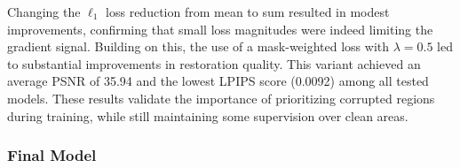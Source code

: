 \documentclass[10pt,a4paper,twocolumn,twoside]{article}
\begin{document}
Changing the $\ell_1$ loss reduction from mean to sum resulted in modest improvements, confirming that small loss magnitudes were indeed limiting the gradient signal. Building on this, the use of a mask-weighted loss with $\lambda = 0.5$ led to substantial improvements in restoration quality. This variant achieved an average PSNR of 35.94 and the lowest LPIPS score (0.0092) among all tested models. These results validate the importance of prioritizing corrupted regions during training, while still maintaining some supervision over clean areas.
\begin{table}
\begin{center}
\caption{ \small Comparison of final models across seen and unseen data. The One-Stage Final Model clearly outperforms the two-stage pretrained U-Net baselines both in restoration quality and inference speed. In \textbf{bold} the best result in each metric, and underlined the second best.}
\label{table:final_model_results}
\vspace{-2mm}
\setlength{\tabcolsep}{10pt}
\end{center}
\vspace{-1.5em}
\end{table}
\subsubsection{Final Model}
\end{document}
